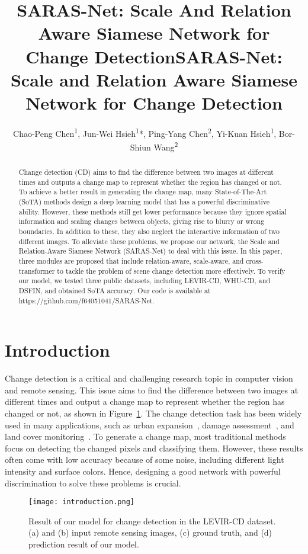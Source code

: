 \documentclass[letterpaper]{article} \usepackage{aaai23}  \usepackage{times}  \usepackage{helvet}  \usepackage{courier}  \usepackage[hyphens]{url}  \usepackage{graphicx} \urlstyle{rm} \def\UrlFont{\rm}  \usepackage{natbib}  \usepackage{caption} \frenchspacing  \setlength{\pdfpagewidth}{8.5in}  \setlength{\pdfpageheight}{11in}  \usepackage{algorithm}
\title{SARAS-Net: Scale And Relation Aware Siamese Network for Change Detection}
\title{SARAS-Net: Scale and Relation Aware Siamese Network for Change Detection}
\author {
Chao-Peng Chen\textsuperscript{\rm 1},
    Jun-Wei Hsieh\textsuperscript{\rm 1}*, 
    Ping-Yang Chen\textsuperscript{\rm 2}, 
    Yi-Kuan Hsieh\textsuperscript{\rm 1}, 
    Bor-Shiun Wang\textsuperscript{\rm 2}
}
\begin{document}
\maketitle

\begin{abstract}
Change detection (CD) aims to find the difference between two images at different times and outputs a change map to represent whether the region has changed or not. To achieve a better result in generating the change map, many State-of-The-Art (SoTA) methods design a deep learning model that has a powerful discriminative ability. However, these methods still get lower performance because they ignore spatial information and scaling changes between objects, giving rise to blurry or wrong boundaries. In addition to these, they also neglect the interactive information of two different images. To alleviate these problems, we propose our network, the Scale and Relation-Aware Siamese Network (SARAS-Net) to deal with this issue. In this paper, three modules are proposed that include relation-aware, scale-aware, and cross-transformer to tackle the problem of scene change detection more effectively.  To verify our model, we tested three public datasets, including LEVIR-CD, WHU-CD, and DSFIN, and obtained SoTA accuracy. Our code is available at https://github.com/f64051041/SARAS-Net.
\end{abstract}

\section{Introduction}
\label{intro}
Change detection is a critical and challenging research topic in computer vision and remote sensing. This issue aims to find the difference between two images at different times and output a change map to represent whether the region has changed or not, as shown in Figure~\ref{introduction}. 
The change detection task has been widely used in many applications, such as urban expansion~\cite{lu2011detection}, damage assessment~\cite{Building_Damage}, and land cover monitoring~\cite{HULLEY2014755}. To generate a change map, most traditional methods focus on detecting the changed pixels and classifying them. However, these results often come with low accuracy because of some noise, including different light intensity and surface colors. Hence, designing a good network with powerful discrimination to solve these problems is crucial.


\begin{figure}
\centering
\texttt{[image: introduction.png]}
\caption{Result of our model for change detection in the LEVIR-CD dataset. (a) and (b) input remote sensing images, (c) ground truth, and (d) prediction result of our model.}
\label{introduction}
\end{figure}
\end{document}
